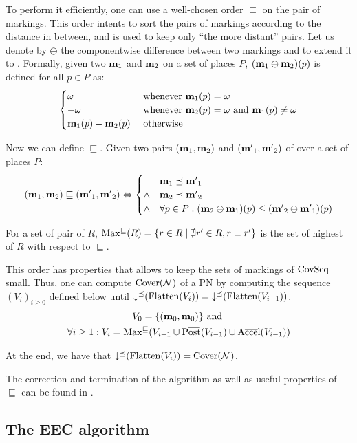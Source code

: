 To perform it efficiently, one can use a well-chosen order $\sqsubseteq$ on the pair of markings.
This order intents to sort the pairs of markings according to the distance in between, and is used to keep only ``the more distant'' pairs.
Let us denote by $\ominus$ the componentwise difference between two markings and to extend it to \omarks.
Formally, given two \omarks $\mathbf{m}_1$ and $\mathbf{m}_2$ on a set of places $P$, $(\mathbf{m}_1 \ominus \mathbf{m}_2)(p)$ is defined for all $p \in P$ as:
\[
  \begin{cases}
    \omega & \text{ whenever } \mathbf{m}_1(p) = \omega \\
    -\omega & \text{ whenever } \mathbf{m}_2(p) = \omega \text{ and } \mathbf{m}_1(p) \neq \omega \\
    \mathbf{m}_1(p) - \mathbf{m}_2(p) & \text{ otherwise}
  \end{cases}
\]

Now we can define $\sqsubseteq$.
Given two pairs $(\mathbf{m}_1, \mathbf{m}_2)$ and $(\mathbf{m'}_1, \mathbf{m'}_2)$ of \omarks over a set of places $P$:
\[
  (\mathbf{m}_1, \mathbf{m}_2) \sqsubseteq (\mathbf{m'}_1, \mathbf{m'}_2) \Leftrightarrow
  \begin{cases}
    & \mathbf{m}_1 \preceq \mathbf{m'}_1 \\
    \wedge & \mathbf{m}_2 \preceq \mathbf{m'}_2 \\
    \wedge & \forall p \in P : (\mathbf{m}_2 \ominus \mathbf{m}_1)(p) \leq (\mathbf{m'}_2 \ominus \mathbf{m'}_1)(p)
  \end{cases}
\]

For a set of pair of \omarks $R$, $\operatorname{Max^\sqsubseteq}(R) = \{ r \in R \mid \nexists r' \in R, r \sqsubseteq r'\}$ is the set of highest \omark of $R$ with respect to $\sqsubseteq$.

This order has properties \citep{Geeraerts07} that allows to keep the sets of markings of $\operatorname{CovSeq}$ small.
Thus, one can compute $\operatorname{Cover}(\mathcal{N})$ of a \ac{PN} \NPTm by computing the sequence $(V_i)_{i \geq 0}$ defined below until $\operatorname{\downarrow^\preceq}(\operatorname{Flatten}(V_i)) = \operatorname{\downarrow^\preceq}(\operatorname{Flatten}(V_{i-1}))$.
\begin{gather*}
  V_0 = \{(\mari, \mari)\} \text{ and } \\
  \forall i \geq 1 : V_i = \Maxs(V_{i-1} \cup \Postb(V_{i-1}) \cup \Accelb(V_{i-1}))
\end{gather*}

At the end, we have that $\operatorname{\downarrow^\preceq}(\operatorname{Flatten}(V_i)) = \operatorname{Cover}(\mathcal{N})$.

The correction and termination of the algorithm as well as useful properties of $\sqsubseteq$ can be found in \cite{Geeraerts07, Ganty09}.

\subsection{The \ac{EEC} algorithm}
\label{sec:eec}

